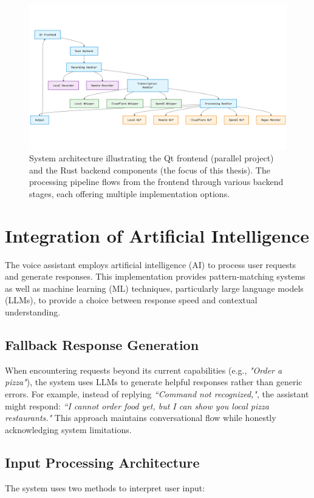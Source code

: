 \begin{figure}[H]
    \centering
    \includegraphics[width=\textwidth]{assets/stackchart}
    \caption{System architecture illustrating the Qt frontend (parallel project)
    and the Rust backend components (the focus of this thesis).
    The processing pipeline flows from the frontend through various backend stages,
    each offering multiple implementation options.}
    \label{fig:design}
\end{figure}

\section{Integration of Artificial Intelligence}
The voice assistant employs artificial intelligence (AI) to process user requests and generate responses.
This implementation provides pattern-matching systems as well as machine learning (ML) techniques,
particularly large language models (LLMs), to provide a choice between response speed and contextual understanding.

\subsection{Fallback Response Generation}
When encountering requests beyond its current capabilities (e.g., \textit{"Order a pizza"}),
the system uses LLMs to generate helpful responses rather than generic errors. For example, instead of replying \textit{``Command not recognized,"},
the assistant might respond: \textit{``I cannot order food yet, but I can show you local pizza restaurants."}
This approach maintains conversational flow while honestly acknowledging system limitations.

\subsection{Input Processing Architecture}
The system uses two methods to interpret user input:

